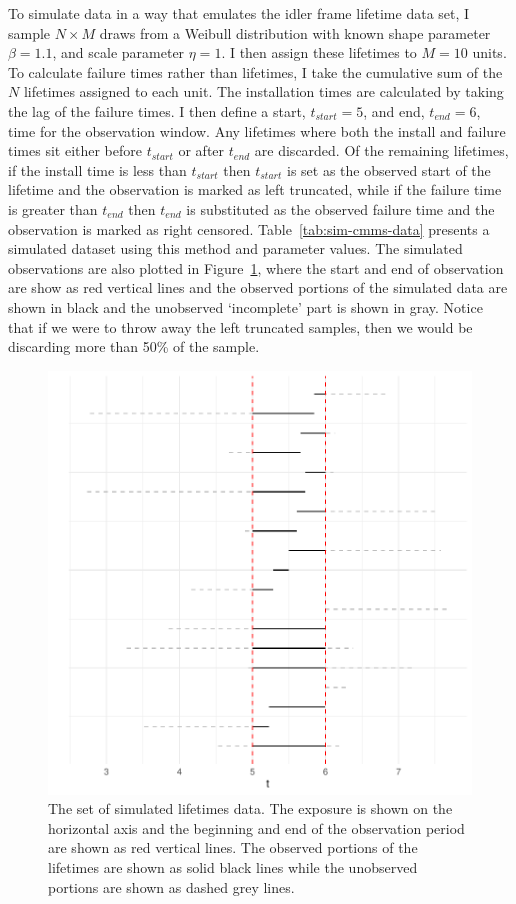 To simulate data in a way that emulates the idler frame lifetime data set, I sample $N \times M$ draws from a Weibull distribution with known shape parameter $\beta = 1.1$, and scale parameter $\eta = 1$. I then assign these lifetimes to $M = 10$ units. To calculate failure times rather than lifetimes, I take the cumulative sum of the $N$ lifetimes assigned to each unit. The installation times are calculated by taking the lag of the failure times. I then define a start, $t_{start} = 5$, and end, $t_{end} = 6$, time for the observation window. Any lifetimes where both the install and failure times sit either before $t_{start}$ or after $t_{end}$ are discarded. Of the remaining lifetimes, if the install time is less than $t_{start}$ then $t_{start}$ is set as the observed start of the lifetime and the observation is marked as left truncated, while if the failure time is greater than $t_{end}$ then $t_{end}$ is substituted as the observed failure time and the observation is marked as right censored. Table~\ref{tab:sim-cmms-data} presents a simulated dataset using this method and parameter values. The simulated observations are also plotted in Figure~\ref{fig:sim_censored_units}, where the start and end of observation are show as red vertical lines and the observed portions of the simulated data are shown in black and the unobserved `incomplete' part is shown in gray. Notice that if we were to throw away the left truncated samples, then we would be discarding more than 50\% of the sample.

\begin{figure}
    \centering
    \includegraphics[width=1\textwidth]{./figures/ch-2/sim-data.pdf}
    \caption{The set of simulated lifetimes data. The exposure is shown on the horizontal axis and the beginning and end of the observation period are shown as red vertical lines. The observed portions of the lifetimes are shown as solid black lines while the unobserved portions are shown as dashed grey lines.}
    \label{fig:sim_censored_units}
\end{figure}

